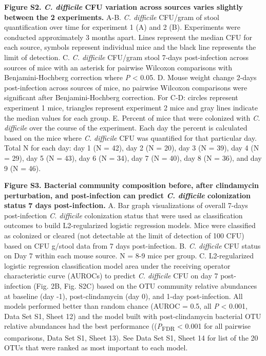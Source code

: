 \documentclass[
  11pt,
]{article}
\begin{document}
\textbf{Figure S2. \emph{C. difficile} CFU variation across sources
varies slightly between the 2 experiments.} A-B. \emph{C. difficile}
CFU/gram of stool quantification over time for experiment 1 (A) and 2
(B). Experiments were conducted approximately 3 months apart. Lines
represent the median CFU for each source, symbols represent individual
mice and the black line represents the limit of detection. C. \emph{C.
difficile} CFU/gram stool 7-days post-infection across sources of mice
with an asterisk for pairwise Wilcoxon comparisons with
Benjamini-Hochberg correction where \emph{P} \textless{} 0.05. D. Mouse
weight change 2-days post-infection across sources of mice, no pairwise
Wilcoxon comparisons were significant after Benjamini-Hochberg
correction. For C-D: circles represent experiment 1 mice, triangles
represent experiment 2 mice and gray lines indicate the median values
for each group. E. Percent of mice that were colonized with \emph{C.
difficile} over the course of the experiment. Each day the percent is
calculated based on the mice where \emph{C. difficile} CFU was
quantified for that particular day. Total N for each day: day 1 (N =
42), day 2 (N = 20), day 3 (N = 39), day 4 (N = 29), day 5 (N = 43), day
6 (N = 34), day 7 (N = 40), day 8 (N = 36), and day 9 (N = 46).

\newpage

\textbf{Figure S3. Bacterial community composition before, after
clindamycin perturbation, and post-infection can predict \emph{C.
difficile} colonization status 7 days post-infection.} A. Bar graph
visualizations of overall 7-days post-infection \emph{C. difficile}
colonization status that were used as classification outcomes to build
L2-regularized logistic regression models. Mice were classified as
colonized or cleared (not detectable at the limit of detection of 100
CFU) based on CFU g/stool data from 7 days post-infection. B. \emph{C.
difficile} CFU status on Day 7 within each mouse source. N = 8-9 mice
per group. C. L2-regularized logistic regression classification model
area under the receiving operator characteristic curve (AUROCs) to
predict \emph{C. difficile} CFU on day 7 post-infection (Fig. 2B, Fig.
S2C) based on the OTU community relative abundances at baseline (day
-1), post-clindamycin (day 0), and 1-day post-infection. All models
performed better than random chance (AUROC = 0.5, all \emph{P}
\textless{} 0.001, Data Set S1, Sheet 12) and the model built with
post-clindamycin bacterial OTU relative abundances had the best
performance ((\emph{P}\textsubscript{FDR} \textless{} 0.001 for all
pairwise comparisons, Data Set S1, Sheet 13). See Data Set S1, Sheet 14
for list of the 20 OTUs that were ranked as most important to each
model.
\end{document}
